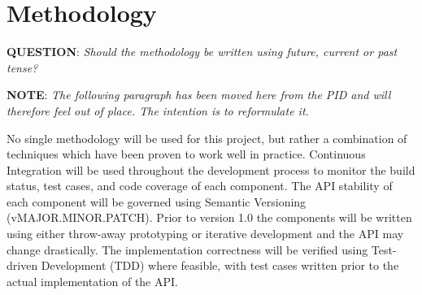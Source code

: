 

\section{Methodology}
\label{sec:methodology}




\textbf{QUESTION}: \textit{Should the methodology be written using future, current or past tense?}



\textbf{NOTE}: \textit{The following paragraph has been moved here from the PID and will therefore feel out of place. The intention is to reformulate it.}

No single methodology will be used for this project, but rather a combination of techniques which have been proven to work well in practice. Continuous Integration will be used throughout the development process to monitor the build status, test cases, and code coverage of each component. The API stability of each component will be governed using Semantic Versioning (vMAJOR.MINOR.PATCH). Prior to version 1.0 the components will be written using either throw-away prototyping or iterative development and the API may change drastically. The implementation correctness will be verified using Test-driven Development (TDD) where feasible, with test cases written prior to the actual implementation of the API.


